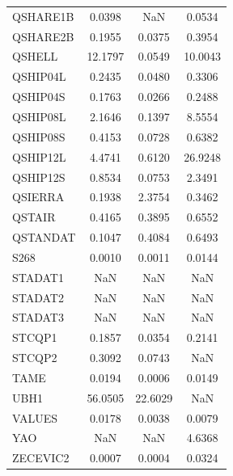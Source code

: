 \begin{longtable}{lccc}
QSHARE1B &   0.0398 &      NaN &   0.0534 \\
QSHARE2B &   0.1955 &   0.0375 &   0.3954 \\
QSHELL   &  12.1797 &   0.0549 &  10.0043 \\
QSHIP04L &   0.2435 &   0.0480 &   0.3306 \\
QSHIP04S &   0.1763 &   0.0266 &   0.2488 \\
QSHIP08L &   2.1646 &   0.1397 &   8.5554 \\
QSHIP08S &   0.4153 &   0.0728 &   0.6382 \\
QSHIP12L &   4.4741 &   0.6120 &  26.9248 \\
QSHIP12S &   0.8534 &   0.0753 &   2.3491 \\
QSIERRA  &   0.1938 &   2.3754 &   0.3462 \\
QSTAIR   &   0.4165 &   0.3895 &   0.6552 \\
QSTANDAT &   0.1047 &   0.4084 &   0.6493 \\
S268     &   0.0010 &   0.0011 &   0.0144 \\
STADAT1  &      NaN &      NaN &      NaN \\
STADAT2  &      NaN &      NaN &      NaN \\
STADAT3  &      NaN &      NaN &      NaN \\
STCQP1   &   0.1857 &   0.0354 &   0.2141 \\
STCQP2   &   0.3092 &   0.0743 &      NaN \\
TAME     &   0.0194 &   0.0006 &   0.0149 \\
UBH1     &  56.0505 &  22.6029 &      NaN \\
VALUES   &   0.0178 &   0.0038 &   0.0079 \\
YAO      &      NaN &      NaN &   4.6368 \\
ZECEVIC2 &   0.0007 &   0.0004 &   0.0324 \\
\end{longtable}
